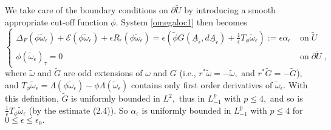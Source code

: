 \documentclass[11pt]{article}
\numberwithin{equation}{section} \setlength{\topmargin}{-35pt}
\begin{document}
We take care of the boundary conditions on $\partial \tilde U$ by
introducing a smooth appropriate cut-off function $\phi.$ System
\eqref{omegaloc1} then becomes
\begin{equation}
\label{omegaloc2} \left \{
\begin{array}{ll}
\Delta_F
(\phi{\tilde\omega}_\epsilon)+\mathcal{E}(\phi{\tilde\omega}_\epsilon)+\epsilon
R_\epsilon(\phi{\tilde\omega}_\epsilon)=\epsilon
(\tilde\phi G(\underline{A}_\epsilon, d\underline{A}_\epsilon)+\frac {1}{\epsilon} T_\phi{\tilde\omega}_\epsilon):= \epsilon \alpha_\epsilon & \;\text{on}\;\tilde U\\
\phi ({\tilde\omega}_\epsilon)_\tau =0 & \;\text{on}\;\partial
\tilde U\;,
\end{array}
\right .
\end{equation}
where $\tilde \omega$ and $\tilde G$ are odd extensions of $\omega$
and $G$ (i.e., $r^* \tilde \omega = - \tilde \omega,$ and $r^*
\tilde G = - \tilde G$), and  $T_\phi{\tilde\omega}_\epsilon =
\Lambda (\phi {\tilde \omega}_\epsilon) - \phi \Lambda (
{\tilde\omega}_\epsilon)$ contains only first order derivatives of
${\tilde\omega}_\epsilon.$ With this definition, $\tilde G$ is
uniformly bounded in $L^2,$ thus in $L^p_{-1}$ with $p\leq 4,$ and
so is $\frac {1}{\epsilon} T_\phi{\tilde\omega}_\epsilon$ (by the
estimate (2.4)). So $\alpha_\epsilon$ is uniformly bounded in
$L^p_{-1}$ with $p\leq 4$ for $0\leq\epsilon\leq\epsilon_0.$
\end{document}
